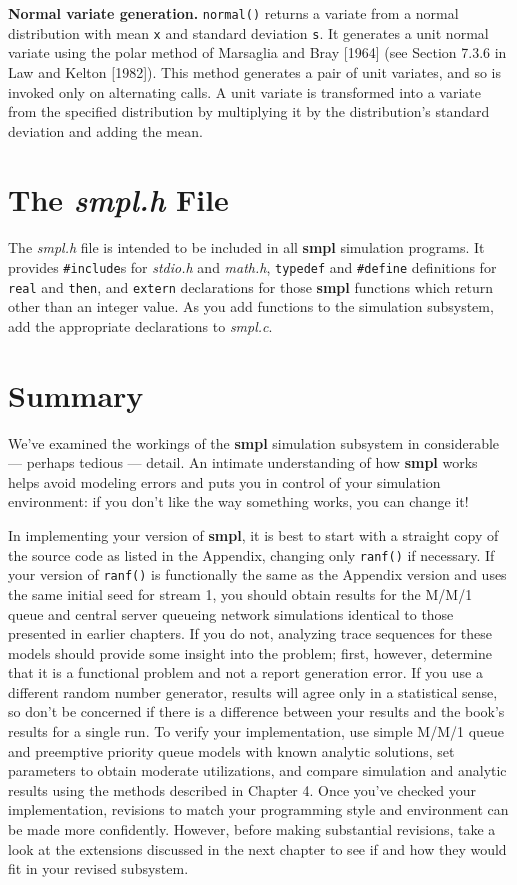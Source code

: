 \textbf{Normal variate generation.} \texttt{normal()} returns a variate from a normal
distribution with mean \texttt{x} and standard deviation \texttt{s}. It generates a unit
normal variate using the polar method of Marsaglia and Bray [1964] (see
Section 7.3.6 in Law and Kelton [1982]). This method generates a pair of unit
variates, and so is invoked only on alternating calls. A unit variate is transformed
into a variate from the specified distribution by multiplying it by
the distribution's standard deviation and adding the mean.

\section{The \textit{smpl.h} File}

The \textit{smpl.h} file is intended to be included in all \textbf{smpl} simulation
programs. It provides \texttt{\#include}s for \textit{stdio.h} and \textit{math.h}, \texttt{typedef} and
\texttt{\#define} definitions for \texttt{real} and \texttt{then}, and \texttt{extern} declarations for those
\textbf{smpl} functions which return other than an integer value. As you add functions
to the simulation subsystem, add the appropriate declarations to
\textit{smpl.c}.

\section{Summary}

We've examined the workings of the \textbf{smpl} simulation subsystem in
considerable --- perhaps tedious --- detail. An intimate understanding of how
\textbf{smpl} works helps avoid modeling errors and puts you in control of your
simulation environment: if you don't like the way something works, you can
change it!

In implementing your version of \textbf{smpl}, it is best to start with a straight
copy of the source code as listed in the Appendix, changing only \texttt{ranf()} if
necessary. If your version of \texttt{ranf()} is functionally the same as the
Appendix version and uses the same initial seed for stream 1, you should
obtain results for the M/M/1 queue and central server queueing network
simulations identical to those presented in earlier chapters. If you do not,
analyzing trace sequences for these models should provide some insight into
the problem; first, however, determine that it is a functional problem and
not a report generation error. If you use a different random number generator,
results will agree only in a statistical sense, so don't be concerned if there is a
difference between your results and the book's results for a single run. To
verify your implementation, use simple M/M/1 queue and preemptive priority
queue models with known analytic solutions, set parameters to obtain
moderate utilizations, and compare simulation and analytic results using the
methods described in Chapter 4. Once you've checked your implementation,
revisions to match your programming style and environment can be made
more confidently. However, before making substantial revisions, take a look
at the extensions discussed in the next chapter to see if and how they would
fit in your revised subsystem.
